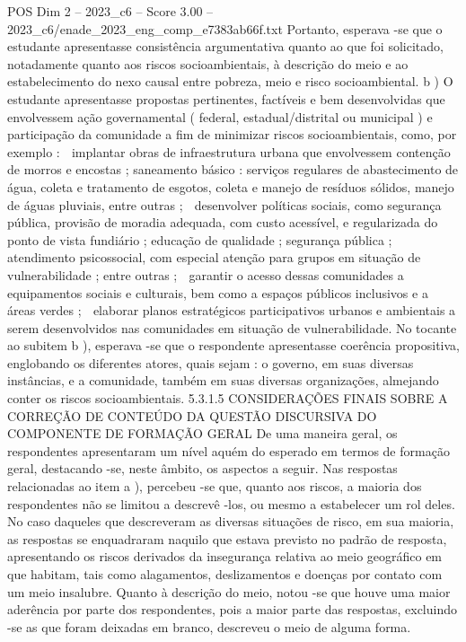 \begin{textsample}{POS Dim 2 – 2023\_c6 – Score 3.00 – 2023\_c6/enade\_2023\_eng\_comp\_e7383ab66f.txt}
Portanto, esperava -se que o estudante apresentasse consistência argumentativa quanto ao que foi solicitado, notadamente quanto aos riscos socioambientais, à descrição do meio e ao estabelecimento do nexo causal entre pobreza, meio e risco socioambiental. b ) O estudante apresentasse propostas pertinentes, factíveis e bem desenvolvidas que envolvessem ação governamental ( federal, estadual/distrital ou municipal ) e participação da comunidade a fim de minimizar riscos socioambientais, como, por exemplo :  implantar obras de infraestrutura urbana que envolvessem contenção de morros e encostas ; saneamento básico : serviços regulares de abastecimento de água, coleta e tratamento de esgotos, coleta e manejo de resíduos sólidos, manejo de águas pluviais, entre outras ;  desenvolver políticas sociais, como segurança pública, provisão de moradia adequada, com custo acessível, e regularizada do ponto de vista fundiário ; educação de qualidade ; segurança pública ; atendimento psicossocial, com especial atenção para grupos em situação de vulnerabilidade ; entre outras ;  garantir o acesso dessas comunidades a equipamentos sociais e culturais, bem como a espaços públicos inclusivos e a áreas verdes ;  elaborar planos estratégicos participativos urbanos e ambientais a serem desenvolvidos nas comunidades em situação de vulnerabilidade.
No tocante ao subitem b ), esperava -se que o respondente apresentasse coerência propositiva, englobando os diferentes atores, quais sejam : o governo, em suas diversas instâncias, e a comunidade, também em suas diversas organizações, almejando conter os riscos socioambientais. 5.3.1.5 CONSIDERAÇÕES FINAIS SOBRE A CORREÇÃO DE CONTEÚDO DA QUESTÃO DISCURSIVA DO COMPONENTE DE FORMAÇÃO GERAL De uma maneira geral, os respondentes apresentaram um nível aquém do esperado em termos de formação geral, destacando -se, neste âmbito, os aspectos a seguir.
Nas respostas relacionadas ao item a ), percebeu -se que, quanto aos riscos, a maioria dos respondentes não se limitou a descrevê -los, ou mesmo a estabelecer um rol deles.
No caso daqueles que descreveram as diversas situações de risco, em sua maioria, as respostas se enquadraram naquilo que estava previsto no padrão de resposta, apresentando os riscos derivados da insegurança relativa ao meio geográfico em que habitam, tais como alagamentos, deslizamentos e doenças por contato com um meio insalubre.
Quanto à descrição do meio, notou -se que houve uma maior aderência por parte dos respondentes, pois a maior parte das respostas, excluindo -se as que foram deixadas em branco, descreveu o meio de alguma forma.

\end{textsample}
